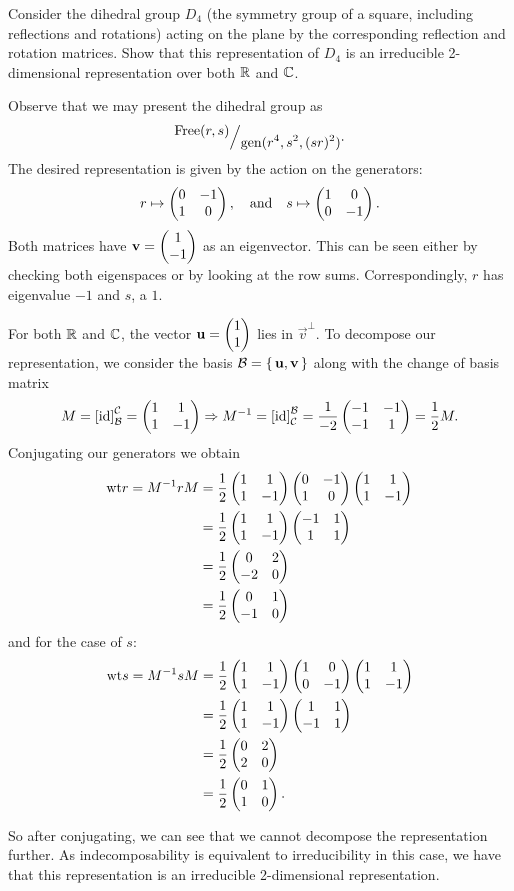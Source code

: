 \documentclass[12pt]{memoir}
\begin{document}
\begin{Ej}
    Consider the dihedral group $D_4$ (the symmetry group of a square, including reﬂections and
rotations) acting on the plane by the corresponding reﬂection and rotation matrices. Show that this
representation of $D_4$ is an irreducible 2-dimensional representation over both $\mathbb{R}$ and $\mathbb{C}$.
\end{Ej}

\begin{ptcbr}
    Observe that we may present the dihedral group as 
$$\quot{\text{Free}(r,s)}{\gen(r^4,s^2,(sr)^2)}.$$
The desired representation is given by the action on the generators:
$$r\mapsto\begin{pmatrix} 0 & -1 \\ 1 & 0 \end{pmatrix},\quad\text{and}\quad s\mapsto\begin{pmatrix} 1 & 0 \\ 0 & -1 \end{pmatrix}.$$
Both matrices have $\mathbf{v}=\begin{pmatrix} 1 \\ -1 \end{pmatrix}$ as an eigenvector. This can be seen either by checking both eigenspaces or by looking at the row sums. Correspondingly, $r$ has eigenvalue $-1$ and $s$, a $1$.\par 
For both $\mathbb{R}$ and $\mathbb{C}$, the vector $\mathbf{u}=\begin{pmatrix} 1 \\ 1 \end{pmatrix}$ lies in $\vec v^\perp$. To decompose our representation, we consider the basis $\mathcal{B}=\{\,\mathbf{u},\mathbf{v}\,\}$ along with the change of basis matrix 
$$M=\bonj{\id}_\cB^\cC=\twobytwo{1}{1}{1}{-1}\To M^{-1}=\bonj{\id}_\cC^\cB=\frac{1}{-2}\twobytwo{-1}{-1}{-1}{1}=\half M.$$
Conjugating our generators we obtain
\begin{align*}
\wt{r}=M^{-1}rM
&=\half\twobytwo{1}{1}{1}{-1}\twobytwo{0}{-1}{1}{0}\twobytwo{1}{1}{1}{-1}\\
&=\half\twobytwo{1}{1}{1}{-1}\twobytwo{-1}{1}{1}{1}\\
&=\half\twobytwo{0}{2}{-2}{0}\\
&=\half\twobytwo{0}{1}{-1}{0}
\end{align*}
and for the case of $s$:
\begin{align*}
    \wt{s}=M^{-1}sM
    &=\half\twobytwo{1}{1}{1}{-1}\twobytwo{1}{0}{0}{-1}\twobytwo{1}{1}{1}{-1}\\
    &=\half\twobytwo{1}{1}{1}{-1}\twobytwo{1}{1}{-1}{1}\\
    &=\half\twobytwo{0}{2}{2}{0}\\
    &=\half\twobytwo{0}{1}{1}{0}.
    \end{align*}

    So after conjugating, we can see that we cannot decompose the representation further. As indecomposability is equivalent to irreducibility in this case, we have that this representation is an irreducible 2-dimensional representation.
\end{ptcbr}
\end{document}
